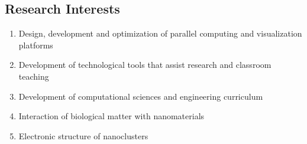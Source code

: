%
\subsection*{Research Interests} 
\begin{enumerate}
  \item Design, development and optimization of parallel computing
        and visualization platforms

  \item Development of technological tools that assist research
        and classroom teaching

  \item Development of computational sciences and engineering curriculum

  \item Interaction of biological matter with nanomaterials

  \item Electronic structure of nanoclusters
\end{enumerate}
